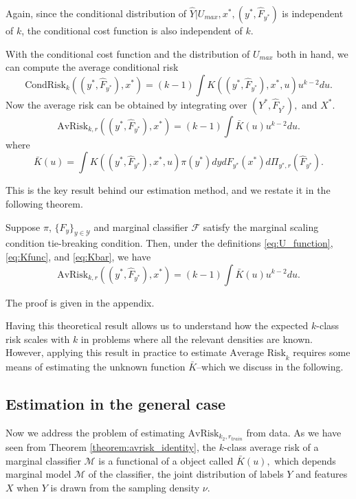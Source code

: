 \documentclass[12pt]{article}
\begin{document}
Again, since the conditional distribution of $\hat{Y}|U_{max}, x^*,
(y^*, \hat{F}_{y^*})$ is independent of $k$, the conditional cost
function is also independent of $k$.

With the conditional cost function and the distribution of $U_{max}$ both in hand, we can compute the average conditional risk
\[
\text{CondRisk}_k((y^*, \hat{F}_{y^*}), x^*) = (k-1) \int K((y^*,\hat{F}_{y^*}), x^*, u) u^{k-2} du.
\]
Now the average risk can be obtained by integrating over $(Y^*, \hat{F}_{Y^*}),$ and $X^*$.
\[
\text{AvRisk}_{k, r}((y^*, \hat{F}_{y^*}), x^*) = (k-1) \int \bar{K}(u) u^{k-2} du.
\]
where
\begin{equation}\label{eq:Kbar}
\bar{K}(u) = \int K((y^*,\hat{F}_{y^*}), x^*, u) \pi(y^*)dy dF_{y^*}(x^*) d\Pi_{y^*, r}(\hat{F}_{y^*}).
\end{equation}


This is the key result behind our estimation method, and we restate it
in the following theorem.

\begin{theorem}\label{theorem:avrisk_identity}
Suppose $\pi$, $\{F_y\}_{y \in \mathcal{Y}}$ and marginal classifier
$\mathcal{F}$ satisfy the marginal scaling condition tie-breaking
condition.  Then, under the
definitions \eqref{eq:U_function}, \eqref{eq:Kfunc},
and \eqref{eq:Kbar}, we have
\begin{equation}\label{eq:avrisk_identity}
\text{AvRisk}_{k, r}((y^*, \hat{F}_{y^*}), x^*) = (k-1) \int \bar{K}(u) u^{k-2} du.
\end{equation}
\end{theorem}

The proof is given in the appendix.

Having this theoretical result allows us to understand how the
expected $k$-class risk scales with $k$ in problems where all the
relevant densities are known.  However, applying this result in
practice to estimate $\text{Average Risk}_k$ requires some means of
estimating the unknown function $\bar{K}$--which we discuss in the
following.

\subsection{Estimation in the general case}\label{sec:estimation}

Now we address the problem of estimating $\text{AvRisk}_{k_2,
r_{train}}$ from data.  As we have seen from
Theorem \ref{theorem:avrisk_identity}, the $k$-class average risk of
a marginal classifier $\mathcal{M}$ is a functional of a object called
$\bar{K}(u),$ which depends marginal model $\mathcal{M}$ of the
classifier, the joint distribution of labels $Y$ and features $X$ when
$Y$ is drawn from the sampling density $\nu$.
\end{document}
